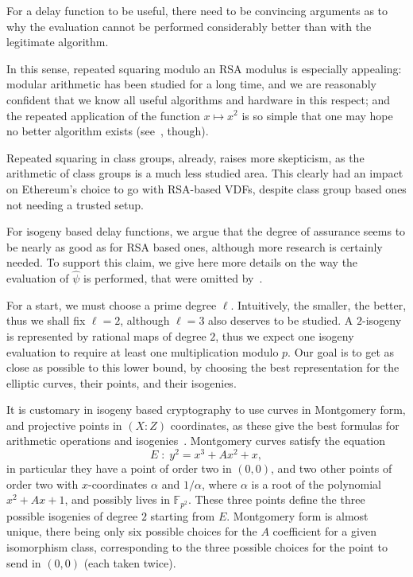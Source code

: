 \documentclass{llncs}
\newcommand{\F}{\mathbb{F}}
\begin{document}
For a delay function to be useful, there need to be convincing
arguments as to why the evaluation cannot be performed considerably
better than with the legitimate algorithm.

In this sense, repeated squaring modulo an RSA modulus is especially
appealing: modular arithmetic has been studied for a long time, and we
are reasonably confident that we know all useful algorithms and
hardware in this respect; and the repeated application of the function
$x\mapsto x^2$ is so simple that one may hope no better algorithm
exists (see~\cite{BernsteinSorenson07}, though).

Repeated squaring in class groups, already, raises more skepticism, as
the arithmetic of class groups is a much less studied area. %
This clearly had an impact on Ethereum's choice to go with RSA-based
VDFs, despite class group based ones not needing a trusted setup.

For isogeny based delay functions, we argue that the degree of
assurance seems to be nearly as good as for RSA based ones, although
more research is certainly needed. %
To support this claim, we give here more details on the way the
evaluation of $\hat\psi$ is performed, that were omitted
by~\cite{10.1007/978-3-030-34578-5_10}.

For a start, we must choose a prime degree $\ell$. %
Intuitively, the smaller, the better, thus we shall fix $\ell=2$,
although $\ell=3$ also deserves to be studied. %
A $2$-isogeny is represented by rational maps of degree $2$, thus we
expect one isogeny evaluation to require at least one multiplication
modulo $p$. %
Our goal is to get as close as possible to this lower bound, by
choosing the best representation for the elliptic curves, their
points, and their isogenies.

It is customary in isogeny based cryptography to use curves in
Montgomery form, and projective points in $(X:Z)$ coordinates, as
these give the best formulas for arithmetic operations and
isogenies~\cite{costello2016sidh,10.1007/978-3-319-79063-3_11}. %
Montgomery curves satisfy the equation
\[E \;:\; y^2 = x^3 + Ax^2 + x,\] %
in particular they have a point of order two in $(0,0)$, and two other
points of order two with $x$-coordinates $\alpha$ and $1/\alpha$,
where $\alpha$ is a root of the polynomial $x^2+Ax+1$, and possibly
lives in $\F_{p^2}$. %
These three points define the three possible isogenies of degree $2$
starting from $E$. %
Montgomery form is almost unique, there being only six possible
choices for the $A$ coefficient for a given isomorphism class,
corresponding to the three possible choices for the point to send in
$(0,0)$ (each taken twice).
\end{document}
